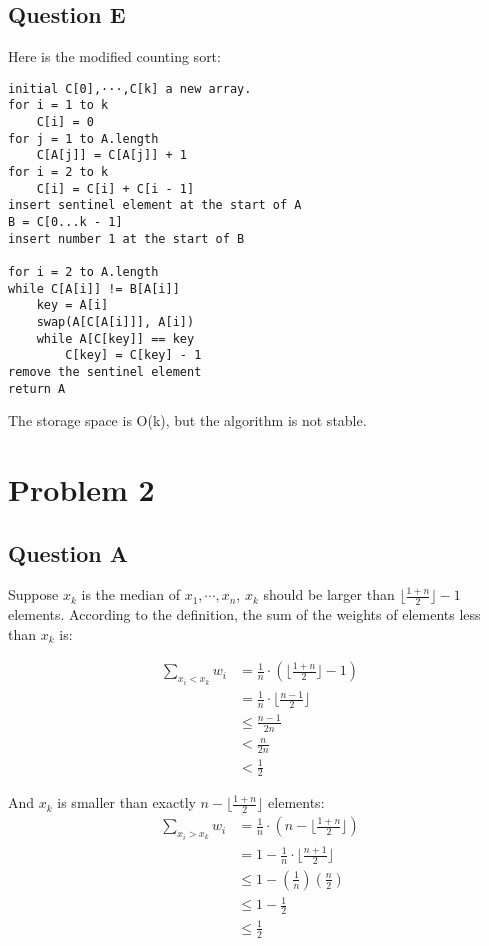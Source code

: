 \documentclass{article}
\begin{document}
\subsection{Question E}

Here is the modified counting sort:
\begin{lstlisting}
initial C[0],···,C[k] a new array.
for i = 1 to k
    C[i] = 0
for j = 1 to A.length
    C[A[j]] = C[A[j]] + 1
for i = 2 to k
    C[i] = C[i] + C[i - 1]
insert sentinel element at the start of A
B = C[0...k - 1]
insert number 1 at the start of B

for i = 2 to A.length
while C[A[i]] != B[A[i]]
    key = A[i]
    swap(A[C[A[i]]], A[i])
    while A[C[key]] == key 
        C[key] = C[key] - 1
remove the sentinel element
return A
\end{lstlisting}

The storage space is O(k), but the algorithm is not stable.

\section{Problem 2}
\subsection{Question A}
Suppose $x_k$ is the median of $x_1,\cdots,x_n$, $x_k$ should be larger than $\lfloor \frac{1 + n}{2}\rfloor - 1$ elements. 
According to the definition, the sum of the weights of elements less than $x_k$ is: 

\begin{equation}
    \begin{aligned}
        \sum_{x_i<x_k} w_i &= \frac{1}{n} \cdot ( \lfloor \frac{1+n}{2} \rfloor - 1 )\\
        &= \frac{1}{n} \cdot \lfloor \frac{n-1}{2} \rfloor\\
        &\leq \frac{n-1}{2n}\\
        &<\frac{n}{2n}\\
        &<\frac{1}{2}
    \end{aligned}
\end{equation}

And $x_k$ is smaller than exactly $n - \lfloor \frac{1+n}{2} \rfloor$ elements:
\begin{equation}
    \begin{aligned}
        \sum_{x_i>x_k} w_i &= \frac{1}{n} \cdot (n - \lfloor \frac{1+n}{2} \rfloor)\\
        &= 1 - \frac{1}{n} \cdot \lfloor \frac{n+1}{2} \rfloor\\
        &\leq 1 - (\frac{1}{n})(\frac{n}{2})\\
        &\leq 1 - \frac{1}{2}\\
        &\leq \frac{1}{2}
    \end{aligned}
\end{equation}
\end{document}
